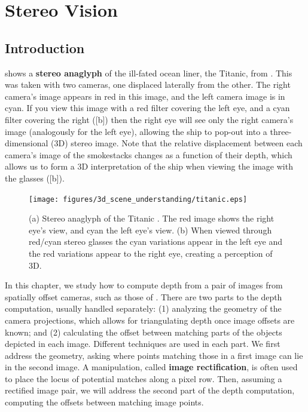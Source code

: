 \chapter{Stereo Vision}
\label{chap:stereo_vision}

\section{Introduction}

 shows a {\bf stereo anaglyph}
of the ill-fated ocean liner, the Titanic, from \cite{McManus2022}.  This was taken with two cameras, one displaced laterally from the other.  The right camera's image appears in red in this image, and the left camera image is in cyan.  If you view this image with a red filter covering the left eye, and a cyan filter covering the right (\fig{\ref{fig:titanic}}[b]) then the right eye will see only the right camera's image (analogously for the left eye), allowing the ship to pop-out into a three-dimensional (3D) stereo image.  Note that the relative displacement between each camera's image of the smokestacks changes as a function of their depth, which allows us to form a 3D interpretation of the ship when viewing the image with the glasses (\fig{\ref{fig:titanic}}[b]).

\begin{figure}[h]
    \centerline{
        \texttt{[image: figures/3d\_scene\_understanding/titanic.eps]}
    }
    \caption{(a) Stereo anaglyph of the Titanic \cite{McManus2022}.  The red image shows the right eye's view, and cyan the left eye's view.  (b) When viewed through red/cyan stereo glasses the cyan variations appear in the left eye and the red variations appear to the right eye, creating a perception of 3D.}
    \label{fig:titanic}
\end{figure}


In this chapter, we study how to compute depth from a pair of images from spatially offset cameras, such as those of \fig{\ref{fig:titanic}}.  There are two parts to the depth computation, usually handled separately:  (1) analyzing the geometry of the camera projections, which allows for triangulating depth once image offsets are known; and (2) calculating the offset between matching parts of the objects depicted in each image.  Different techniques are used in each part.  We first address the geometry, asking where points matching those in a first image can lie in the second image. A manipulation, called {\bf image rectification}, is often used to place the locus of potential matches along a pixel row.  Then, assuming a rectified image pair, we will address the second part of the depth computation, computing the offsets between matching image points.



